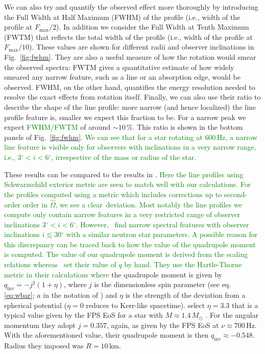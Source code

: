 \documentclass{aa}
\newcommand{\refe}[1]{\textcolor{green}{{#1}}}
\newcommand{\sch}{Schwarzschild }
\newcommand{\Ob}{\ensuremath{\hat{\Omega}}}
\newcommand{\Msun}{\ensuremath{M_{\odot}}}
\newcommand{\qinv}{\ensuremath{q_{\mathrm{inv}}}}
\renewcommand{\deg}{\ensuremath{^{\circ}}}
\begin{document}
We can also try and quantify the observed effect more thoroughly by introducing the Full Width at Half Maximum (FWHM) of the profile (i.e., width of the profile at $F_{\mathrm{max}}/2$).
In addition we consider the Full Width at Tenth Maximum (FWTM) that reflects the total width of the profile (i.e., width of the profile at $F_{\mathrm{max}}/10$).
These values are shown for different radii and observer inclinations in Fig.~\ref{fig:fwhm}.
They are also a useful measure of how the rotation would smear the observed spectra:
FWTM gives a quantitative estimate of how widely smeared any narrow feature, such as a line or an absorption edge, would be observed.
FWHM, on the other hand, quantifies the energy resolution needed to resolve the exact effects from rotation itself.
Finally, we can also use their ratio to describe the shape of the line profile:
more narrow (and hence localized) the line profile feature is, smaller we expect this fraction to be.
For a narrow peak we expect \refe{FWHM/FWTM} of around $\sim 10\,\%$.
This ratio is shown in the bottom panels of Fig.~\ref{fig:fwhm}.
\refe{We can see that for a star rotating at $600\,\mathrm{Hz}$, a narrow line feature is visible only for observers with inclinations in a very narrow range, i.e., $3\deg  < i < 6\deg$, irrespective of the mass or radius of the star.}


These results can be compared to the results in \citet{BPO13}. 
\refe{Here the line profiles using \sch exterior metric are seen to match well with our calculations.}
\refe{For the profiles computed using a metric which includes corrections up to second-order order in $\Ob$, we see a clear deviation.}
\refe{Most notably the line profiles we compute only contain narrow features in a very restricted range of observer inclinations $3\deg  < i < 6\deg$.}
\refe{However, \citet{BPO13} find narrow spectral features with observer inclinations $i \lesssim 30\deg$ with a similar neutron star parameters.}
\refe{A possible reason for this discrepancy can be traced back to how the value of the quadrupole moment is computed.}
\refe{The value of our quadrupole moment is derived from the scaling relations whereas \citet{BPO13} set their value of $q$ by hand.}
\refe{They use the Hartle-Thorne metric \citep{HT68} in their calculations where} the quadrupole moment is given by $\qinv = -j^2 (1 + \eta)$, where $j$ is the dimensionless spin parameter (see eq. \eqref{eq:wbar}; $a$ in the notation of \citealt{BPO13}) and $\eta$ is the strength of the deviation from a spherical potential ($\eta = 0$ reduces to Kerr-like spacetime).
\citet{BPO13} select $\eta=3.3$ that is a typical value given by the FPS EoS \citep{FPS} for a star with $M\approx1.4\,\Msun$ \citep[see][]{LP99}.
For the angular momentum they adopt $j = 0.357$, again, as given by the FPS EoS at $\nu \approx 700\,\mathrm{Hz}$.
With the aforementioned value, their quadrupole moment is then $\qinv \approx -0.548$.
Radius they imposed was $R = 10\,\mathrm{km}$.
\end{document}

